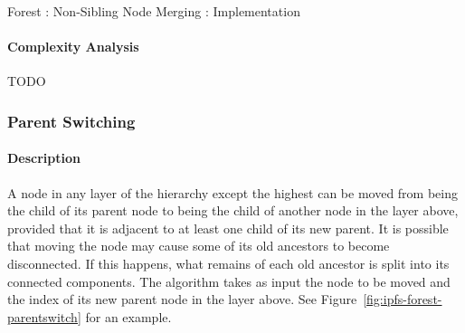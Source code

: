 \begin{stulisting}[p]
\caption{Forest : Non-Sibling Node Merging : Implementation}
\label{code:ipfs-forest-mergenonsiblingnodes}

\end{stulisting}

\paragraph{Complexity Analysis}

TODO

\afterpage{\clearpage}
\newpage

\subsubsection{Parent Switching}

\paragraph{Description}

A node in any layer of the hierarchy except the highest can be moved from being the child of its parent node to being the child of another node in the layer above, provided that it is adjacent to at least one child of its new parent. It is possible that moving the node may cause some of its old ancestors to become disconnected. If this happens, what remains of each old ancestor is split into its connected components. The algorithm takes as input the node to be moved and the index of its new parent node in the layer above. See Figure~\ref{fig:ipfs-forest-parentswitch} for an example.

